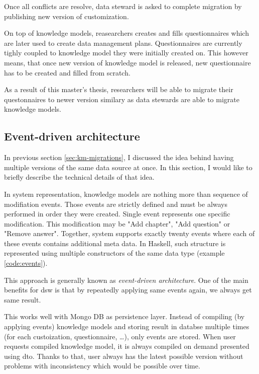 Once all conflicts are resolve, data steward is asked to complete migration by publishing new version of customization.

On top of knowledge models, reasearchers creates and fills questionnaires which are later used to create data management plans.
Questionnaires are currently tighly coupled to knowledge model they were initially created on.
This however means, that once new version of knowledge model is released, new questionnaire has to be created and filled from scratch.

As a result of this master's thesis, researchers will be able to migrate their questonnaires to newer version similary as data stewards are able to migrate knowledge models.

\subsection{Event-driven architecture}

In previous section \ref{sec:km-migrations}, I discussed the idea behind having multiple versions of the same data source at once.
In this section, I would like to briefly describe the technical details of that idea.

In system representation, knowledge models are nothing more than sequence of modifiation events.
Those events are strictly defined and must be always performed in order they were created.
Single event represents one specific modification.
This modification may be "Add chapter", "Add question" or "Remove answer".
Together, system supports exactly twenty events where each of these events contains additional meta data.
In Haskell, such structure is represented using multiple constructors of the same data type (example \ref{code:events}).


This approach is generally known as \textit{event-driven architecture}\cite{mdm-event-architecture}.
One of the main benefits for \gls{dsw} is that by repeatedly applying same events again, we always get same result.

This works well with Mongo DB as persistence layer.
Instead of compiling (by applying events) knowledge models and storing result in databse multiple times (for each custoization, questionnaire, \dots), only events are stored.
When user requests compiled knowledge model, it is always compiled on demand presented using dto.
Thanks to that, user always has the latest possible version without problems with inconsistency which would be possible over time.

